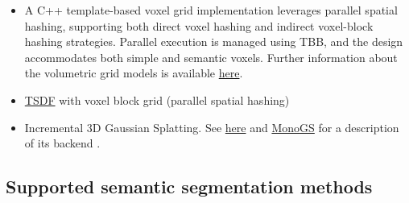 \documentclass{article}
\providecommand{\tightlist}{%
  \setlength{\itemsep}{0pt}\setlength{\parskip}{0pt}}
\begin{document}
\begin{itemize}
\tightlist
\item
  A C++ template-based voxel grid implementation leverages parallel
  spatial hashing, supporting both direct voxel hashing and indirect
  voxel-block hashing strategies. Parallel execution is managed using
  TBB, and the design accommodates both simple and semantic voxels.
  Further information about the volumetric grid models is available
  \href{https://github.com/luigifreda/pyslam/blob/master/pyslam/cpp/volumetric/README.md}{here}.
\item    
  \href{https://arxiv.org/pdf/2110.00511}{TSDF} with voxel block grid
  (parallel spatial hashing)~\cite{dong2022ash}
\item
  Incremental 3D Gaussian Splatting. See
  \href{https://repo-sam.inria.fr/fungraph/3d-gaussian-splatting/}{here}
  and \href{https://arxiv.org/abs/2312.06741}{MonoGS} for a description
  of its backend \cite{matsuki2023gaussian, kerbl20233d}.
\end{itemize}

\hypertarget{supported-semantic-segmentation-methods}{%
\subsection{Supported semantic segmentation
methods}\label{supported-semantic-segmentation-methods}}
\end{document}
